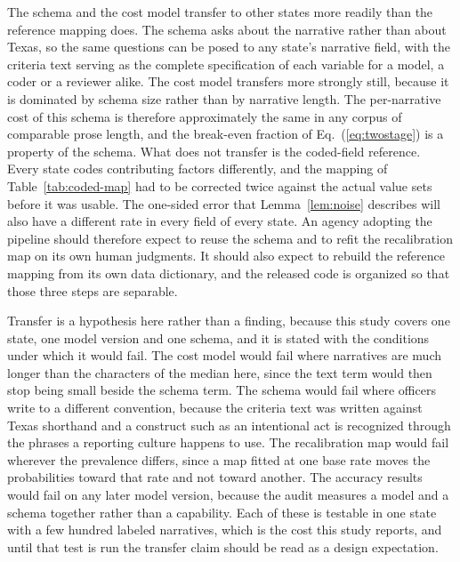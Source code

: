 The schema and the cost model transfer to other states more readily than the reference
mapping does. The schema asks about the narrative rather than about Texas, so the same
questions can be posed to any state's narrative field, with the criteria text serving as the
complete specification of each variable for a model, a coder or a reviewer alike. The cost
model transfers more strongly still, because it is dominated by schema size rather than by
narrative length. The per-narrative cost of this schema is therefore approximately the same
in any corpus of comparable prose length, and the break-even fraction of
Eq.~(\ref{eq:twostage}) is a property of the schema. What does not transfer is the coded-field
reference. Every state codes contributing factors differently, and the mapping of
Table~\ref{tab:coded-map} had to be corrected twice against the actual value sets before it
was usable. The one-sided error that Lemma~\ref{lem:noise} describes will also have a
different rate in every field of every state. An agency adopting the pipeline should
therefore expect to reuse the schema and to refit the recalibration map on its own human
judgments. It should also expect to rebuild the reference mapping from its own data
dictionary, and the released code is organized so that those three steps are separable.

Transfer is a hypothesis here rather than a finding, because this study covers one state, one
model version and one schema, and it is stated with the conditions under which it would fail.
The cost model would fail where narratives are much longer than the \MedianNarrativeChars{}
characters of the median here, since the text term would then stop being small beside the
schema term. The schema would fail where officers write to a different convention, because the
criteria text was written against Texas shorthand and a construct such as an intentional act is
recognized through the phrases a reporting culture happens to use. The recalibration map would
fail wherever the prevalence differs, since a map fitted at one base rate moves the
probabilities toward that rate and not toward another. The accuracy results would fail on any
later model version, because the audit measures a model and a schema together rather than a
capability. Each of these is testable in one state with a few hundred labeled narratives, which
is the cost this study reports, and until that test is run the transfer claim should be read as
a design expectation.

